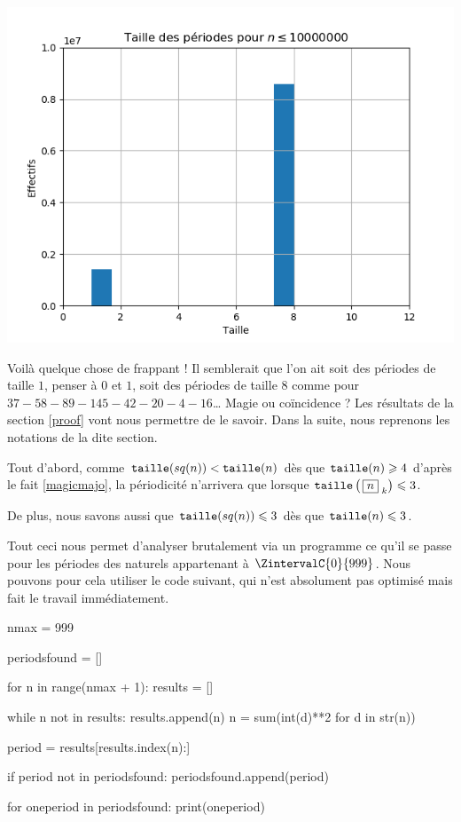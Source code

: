 \begin{center}
	\includegraphics[scale=.9]{squares-int/periods.png}
\end{center}


\medskip

Voilà quelque chose de frappant ! Il semblerait que l'on ait soit des périodes de taille $1$, penser à $0$ et $1$, soit des périodes de taille $8$ comme pour $37 - 58 - 89 - 145 - 42 - 20 - 4 - 16$\dots{}
Magie ou coïncidence ? Les résultats de la section \ref{proof} vont nous permettre de le savoir. Dans la suite, nous reprenons les notations de la dite section.


\medskip

Tout d'abord, comme $\operatorname{\text{\normalfont\texttt{taille}}}(sq(n)) < \operatorname{\text{\normalfont\texttt{taille}}}(n)$ dès que $\operatorname{\text{\normalfont\texttt{taille}}}(n) \geqslant 4$ d'après le fait \ref{magicmajo}, la périodicité n'arrivera que lorsque $\operatorname{\text{\normalfont\texttt{taille}}}\left( \, \fbox{$n$}_{\,\,k} \right) \leqslant 3$.


\medskip

De plus, nous savons aussi que $\operatorname{\text{\normalfont\texttt{taille}}}(sq(n)) \leqslant 3$ dès que $\operatorname{\text{\normalfont\texttt{taille}}}(n) \leqslant 3$.


\medskip

Tout ceci nous permet d'analyser brutalement via un programme ce qu'il se passe pour les périodes des naturels appartenant à $\ZintervalC{0}{999}$. Nous pouvons pour cela utiliser le code suivant, qui n'est absolument pas optimisé mais fait le travail immédiatement.

\begin{rawcode}
nmax = 999

periodsfound = []

for n in range(nmax + 1):
    results = []

    while n not in results:
        results.append(n)
        n = sum(int(d)**2 for d in str(n))

    period = results[results.index(n):]

    if period not in periodsfound:
        periodsfound.append(period)

for oneperiod in periodsfound:
    print(oneperiod)
\end{rawcode}


